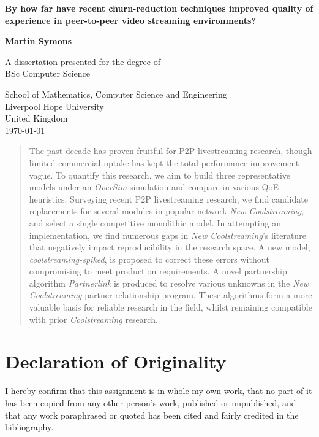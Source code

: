 \documentclass[12pt,a4paper]{article}
\begin{document}
\begin{titlepage}
	\begin{center}
		\vspace*{1cm}
		
		\textbf{By how far have recent churn-reduction techniques improved quality of experience in peer-to-peer video streaming environments?}
		
		\vspace{1.5cm}
		
		\textbf{Martin Symons}
		
		\vfill
		
		A dissertation presented for the degree of\\
		BSc Computer Science
		
		\vspace{0.8cm}
		
		School of Mathematics, Computer Science and Engineering\\
		Liverpool Hope University\\
		United Kingdom\\
		\today
		
	\end{center}
\end{titlepage}

\begin{abstract}
The past decade has proven fruitful for P2P livestreaming research, though limited commercial uptake has kept the total performance improvement vague. To quantify this research, we aim to build three representative models under an \textit{OverSim} simulation and compare in various QoE heuristics. Surveying recent P2P livestreaming research, we find candidate replacements for several modules in popular network \textit{New Coolstreaming}, and select a single competitive monolithic model. In attempting an implementation, we find numerous gaps in \textit{New Coolstreaming}'s literature that negatively impact reproducibility in the research space. A new model, \textit{coolstreaming-spiked}, is proposed to correct these errors without compromising to meet production requirements.  A novel partnership algorithm \textit{Partnerlink} is produced to resolve various unknowns in the \textit{New Coolstreaming} partner relationship program. These algorithms form a more valuable basis for reliable research in the field, whilst remaining compatible with prior \textit{Coolstreaming} research.
\end{abstract}

\section{Declaration of Originality}
I hereby confirm that this assignment is in whole my own work, that no part of it has been copied from any other person's work, published or unpublished, and that any work paraphrased or quoted has been cited and fairly credited in the bibliography.
\end{document}

